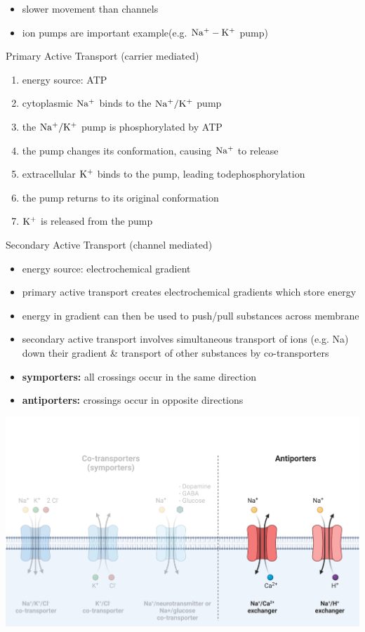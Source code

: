 \documentclass[11pt,fleqn]{book} %
\begin{document}
\begin{descriptions}
\begin{enumerate}
\begin{itemize}
            \item slower movement than channels
            \item ion pumps are important example(e.g. ${\rm Na^+-K^+}$ pump)
        \end{itemize}
    \end{enumerate}
    \item[Primary Active Transport (carrier mediated)]\begin{descriptions}
    \end{descriptions}
    \begin{enumerate}
        \item energy source: ATP
        \item cytoplasmic ${\rm Na^+}$ binds to the ${\rm Na^+/K^+}$ pump
        \item the ${\rm Na^+/K^+}$ pump is phosphorylated by ATP
        \item the pump changes its conformation, causing ${\rm Na^+}$ to release
        \item extracellular ${\rm K^+}$ binds to the pump, leading todephosphorylation
        \item the pump returns to its original conformation
        \item ${\rm K^+}$ is released from the pump
    \end{enumerate}
    \item[Secondary Active Transport (channel mediated)]\begin{descriptions}
    \end{descriptions}
    \begin{itemize}
        \item energy source: electrochemical gradient
        \item primary active transport creates electrochemical gradients which store energy
        \item energy in gradient can then be used to push/pull substances across membrane
        \item secondary active transport involves simultaneous transport of ions (e.g. Na) down their gradient \& transport of other substances by co-transporters
        \item \textbf{symporters:} all crossings occur in the same direction
        \item \textbf{antiporters:} crossings occur in opposite directions
    \end{itemize}
\begin{center}
    \includegraphics[width=0.65\linewidth]{Pictures/Screenshot 2024-02-25 211519.png}

\end{center}
\end{descriptions}
\end{document}
